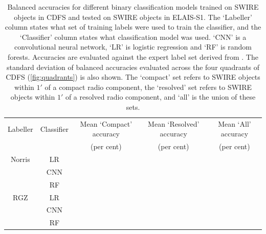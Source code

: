 \documentclass[fleqn,usenatbib,usedcolumn]{mnras}
\begin{document}
  \begin{table}
    \caption{Balanced accuracies for different binary classification models trained on SWIRE objects
    in CDFS and tested on SWIRE objects in ELAIS-S1.
    The `Labeller' column states what set of training labels
    were used to train the classifier, and the `Classifier' column states what
    classification model was used. `CNN' is a convolutional neural network,
    `LR' is logistic regression and `RF' is random forests. Accuracies are evaluated against the expert
    label set derived from \citet{middelberg08}. The standard deviation of balanced accuracies evaluated across the four quadrants of
    CDFS (\autoref{fig:quadrants}) is also shown. The `compact' set refers to SWIRE
    objects within $1'$ of a compact radio component, the `resolved' set refers to
    SWIRE objects within $1'$ of a resolved radio component, and `all' is the union of these sets.}
    \label{tab:elais-ba}
    \begin{tabular}{ccccc}
      \hline
      Labeller & Classifier & Mean `Compact' accuracy & Mean `Resolved' accuracy & Mean `All' accuracy\\
       &  & (per cent) & (per cent) & (per cent)\\
      \hline
      Norris & LR & & & \\
             & CNN & & & \\
             & RF & & & \\
      RGZ & LR & & & \\
          & CNN & & & \\
          & RF & & & \\
      \hline
    \end{tabular}
  \end{table}
\end{document}

